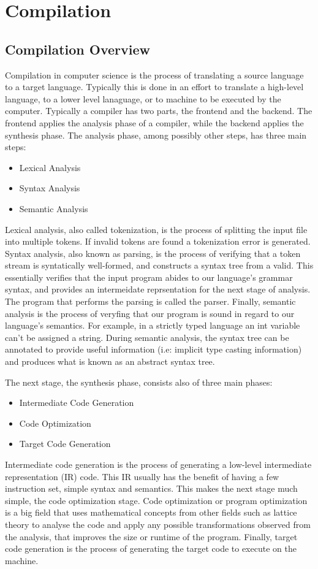 \section{Compilation}
\subsection{Compilation Overview}
Compilation in computer science is the process of translating a source language
to a target language. Typically this is done in an effort to translate a
high-level language, to a lower level lanaguage, or to machine to be executed by
the computer. Typically a compiler has two parts, the frontend and the backend.
The frontend applies the analysis phase of a compiler, while the backend applies
the synthesis phase. The analysis phase, among possibly other steps, has three
main steps:
\begin{itemize}
  \item Lexical Analysis
  \item Syntax Analysis
  \item Semantic Analysis
\end{itemize}
Lexical analysis, also called tokenization, is the process of splitting the
input file into multiple tokens. If invalid tokens are found a tokenization
error is generated. Syntax analysis, also known as parsing, is the process of
verifying that a token stream is syntatically well-formed, and constructs a
syntax tree from a valid. This essentially verifies that the input program
abides to our language's grammar syntax, and provides an intermeidate
reprsentation for the next stage of analysis. The program that performs the
parsing is called the parser. Finally, semantic analysis is the process of
veryfing that our program is sound in regard to our language's semantics. For
example, in a strictly typed language an int variable can't be assigned a
string. During semantic analysis, the syntax tree can be annotated to provide
useful information (i.e: implicit type casting information) and produces what is
known as an abstract syntax tree.

The next stage, the synthesis phase, consists also of three main phases:
\begin{itemize}
  \item Intermediate Code Generation
  \item Code Optimization
  \item Target Code Generation
\end{itemize}
Intermediate code generation is the process of generating a low-level
intermediate representation (IR) code. This IR usually has the benefit of having
a few instruction set, simple syntax and semantics. This makes the next stage
much simple, the code optimization stage. Code optimization or program
optimization is a big field that uses mathematical concepts from other fields
such as lattice theory to analyse the code and apply any possible
transformations observed from the analysis, that improves the size or runtime of
the program. Finally, target code generation is the process of generating the
target code to execute on the machine. %
